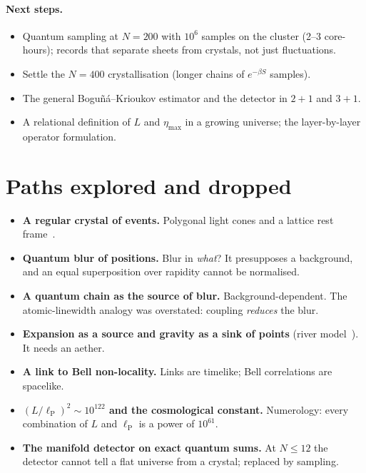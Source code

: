 \documentclass[11pt,a4paper]{article}
\newcommand{\lP}{\ell_{\mathrm P}}
\begin{document}
\paragraph{Next steps.}
\begin{itemize}[leftmargin=*,itemsep=1pt]
\item Quantum sampling at $N=200$ with $10^6$ samples on the cluster (2--3 core-hours); records that separate sheets from crystals, not just fluctuations.
\item Settle the $N=400$ crystallisation (longer chains of $e^{-\beta S}$ samples).
\item The general Boguñá--Krioukov estimator and the detector in $2+1$ and $3+1$.
\item A relational definition of $L$ and $\eta_{\max}$ in a growing universe; the layer-by-layer operator formulation.
\end{itemize}

\appendix
\section{Paths explored and dropped}\label{app:dropped}
\begin{itemize}[leftmargin=*,itemsep=1pt]
\item \textbf{A regular crystal of events.} Polygonal light cones and a lattice rest frame~\cite{Burago,Weyl}.
\item \textbf{Quantum blur of positions.} Blur in \emph{what}? It presupposes a background, and an equal superposition over rapidity cannot be normalised.
\item \textbf{A quantum chain as the source of blur.} Background-dependent. The atomic-linewidth analogy was overstated: coupling \emph{reduces} the blur.
\item \textbf{Expansion as a source and gravity as a sink of points} (river model~\cite{HamiltonLisle08}). It needs an aether.
\item \textbf{A link to Bell non-locality.} Links are timelike; Bell correlations are spacelike.
\item \textbf{$(L/\lP)^2\sim10^{122}$ and the cosmological constant.} Numerology: every combination of $L$ and $\lP$ is a power of $10^{61}$.
\item \textbf{The manifold detector on exact quantum sums.} At $N\le12$ the detector cannot tell a flat universe from a crystal; replaced by sampling.
\end{itemize}
\end{document}
